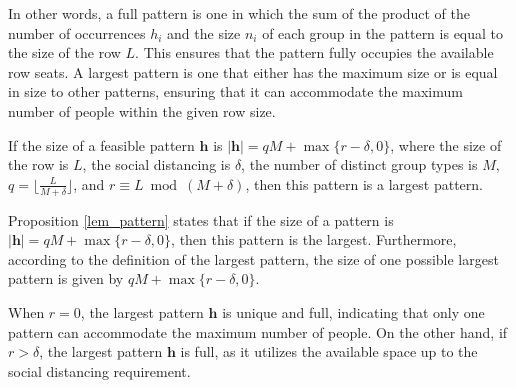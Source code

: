 In other words, a full pattern is one in which the sum of the product of the number of occurrences $h_i$ and the size $n_i$ of each group in the pattern is equal to the size of the row $L$. This ensures that the pattern fully occupies the available row seats. A largest pattern is one that either has the maximum size or is equal in size to other patterns, ensuring that it can accommodate the maximum number of people within the given row size.


\begin{prop}\label{lem_pattern}
If the size of a feasible pattern $\bm{h}$ is $|\bm{h}| = qM + \max\{r-\delta, 0\}$, where the size of the row is $L$, the social distancing is $\delta$, the number of distinct group types is $M$, $q = \lfloor \frac{L}{M + \delta} \rfloor$, and $r \equiv L \bmod (M + \delta)$, then this pattern is a largest pattern.
\end{prop}


Proposition \ref{lem_pattern} states that if the size of a pattern is $|\bm{h}| = qM + \max\{r-\delta, 0\}$, then this pattern is the largest. Furthermore, according to the definition of the largest pattern, the size of one possible largest pattern is given by $qM + \max\{r-\delta, 0\}$.

When $r = 0$, the largest pattern $\bm{h}$ is unique and full, indicating that only one pattern can accommodate the maximum number of people. On the other hand, if $r > \delta$, the largest pattern $\bm{h}$ is full, as it utilizes the available space up to the social distancing requirement.
    
